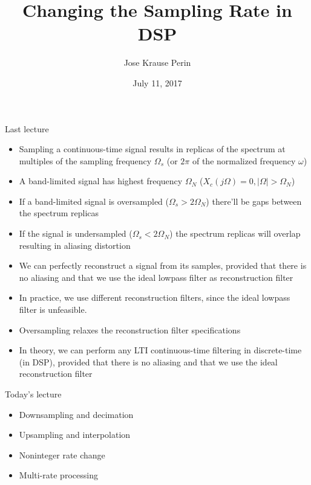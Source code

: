 \documentclass[10pt, aspectratio=169]{beamer}
\title[EE 264]{Changing the Sampling Rate in DSP}
\author{Jose Krause Perin}
\institute{Stanford University}
\date{July 11, 2017}
\begin{document}
\begin{frame}
  \titlepage
\end{frame}

\begin{frame}{Last lecture}
\begin{itemize}
	\item Sampling a continuous-time signal results in replicas of the spectrum at multiples of the sampling frequency $\Omega_s$ (or $2\pi$ of the normalized frequency $\omega$)
	\item A band-limited signal has highest frequency $\Omega_N$ ($X_c(j\Omega) = 0, |\Omega| > \Omega_N$)
	\item If a band-limited signal is oversampled ($\Omega_s > 2\Omega_N$) there'll be gaps between the spectrum replicas
	\item If the signal is undersampled ($\Omega_s < 2\Omega_N$) the spectrum replicas will overlap resulting in aliasing distortion
	\item We can perfectly reconstruct a signal from its samples, provided that there is no aliasing and that we use the ideal lowpass filter as reconstruction filter
	\item In practice, we use different reconstruction filters, since the ideal lowpass filter is unfeasible.
	\item Oversampling relaxes the reconstruction filter specifications
	\item In theory, we can perform any LTI continuous-time filtering in discrete-time (in DSP), provided that there is no aliasing and that we use the ideal reconstruction filter
\end{itemize}
\end{frame}

%
\begin{frame}{Today's lecture} 

\begin{itemize}
	\item Downsampling and decimation
	\item Upsampling and interpolation
	\item Noninteger rate change
	\item Multi-rate processing
\end{itemize}
\end{frame}

%
\end{document}
